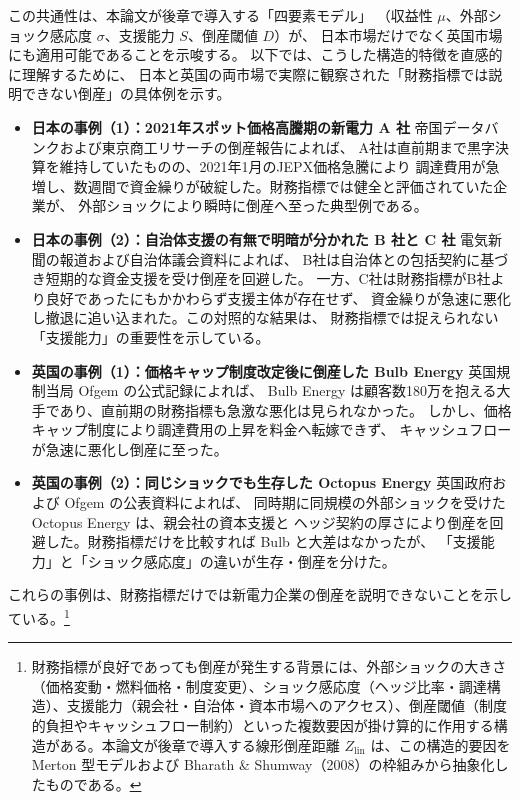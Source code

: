 この共通性は、本論文が後章で導入する「四要素モデル」
（収益性 $\mu$、外部ショック感応度 $\sigma$、支援能力 $S$、倒産閾値 $D$）が、
日本市場だけでなく英国市場にも適用可能であることを示唆する。
以下では、こうした構造的特徴を直感的に理解するために、
日本と英国の両市場で実際に観察された「財務指標では説明できない倒産」の具体例を示す。


\begin{itemize}
    \item \textbf{日本の事例（1）：2021年スポット価格高騰期の新電力 A 社}  
    帝国データバンクおよび東京商工リサーチの倒産報告\parencite{TDB2021PowerCrisis,TSR2021PowerCrisis}によれば、
    A社は直前期まで黒字決算を維持していたものの、2021年1月のJEPX価格急騰により
    調達費用が急増し、数週間で資金繰りが破綻した。財務指標では健全と評価されていた企業が、
    外部ショックにより瞬時に倒産へ至った典型例である。

    \item \textbf{日本の事例（2）：自治体支援の有無で明暗が分かれた B 社と C 社}  
    電気新聞の報道および自治体議会資料\parencite{DenkiShimbun2021Crisis,CityCouncil2021Support}によれば、
    B社は自治体との包括契約に基づき短期的な資金支援を受け倒産を回避した。
    一方、C社は財務指標がB社より良好であったにもかかわらず支援主体が存在せず、
    資金繰りが急速に悪化し撤退に追い込まれた。この対照的な結果は、
    財務指標では捉えられない「支援能力」の重要性を示している。

    \item \textbf{英国の事例（1）：価格キャップ制度改定後に倒産した Bulb Energy}  
    英国規制当局 Ofgem の公式記録\parencite{Ofgem2021BulbSLR}によれば、
    Bulb Energy は顧客数180万を抱える大手であり、直前期の財務指標も急激な悪化は見られなかった。
    しかし、価格キャップ制度により調達費用の上昇を料金へ転嫁できず、
    キャッシュフローが急速に悪化し倒産に至った。

    \item \textbf{英国の事例（2）：同じショックでも生存した Octopus Energy}  
    英国政府および Ofgem の公表資料\parencite{Ofgem2021OctopusTakeover,UKGov2021BulbSupport}によれば、
    同時期に同規模の外部ショックを受けた Octopus Energy は、親会社の資本支援と
    ヘッジ契約の厚さにより倒産を回避した。財務指標だけを比較すれば Bulb と大差はなかったが、
    「支援能力」と「ショック感応度」の違いが生存・倒産を分けた。
\end{itemize}


これらの事例は、財務指標だけでは新電力企業の倒産を説明できないことを示している。\footnote{財務指標が良好であっても倒産が発生する背景には、外部ショックの大きさ（価格変動・燃料価格・制度変更）、ショック感応度（ヘッジ比率・調達構造）、支援能力（親会社・自治体・資本市場へのアクセス）、倒産閾値（制度的負担やキャッシュフロー制約）といった複数要因が掛け算的に作用する構造がある。本論文が後章で導入する線形倒産距離 $Z_{\text{lin}}$ は、この構造的要因を Merton 型モデルおよび Bharath \& Shumway（2008）の枠組みから抽象化したものである。}

